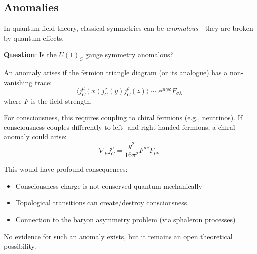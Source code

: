 \begin{advanced}
\subsection{Anomalies}

In quantum field theory, classical symmetries can be \textit{anomalous}---they are broken by quantum effects.

\textbf{Question}: Is the $U(1)_C$ gauge symmetry anomalous?

An anomaly arises if the fermion triangle diagram (or its analogue) has a non-vanishing trace:
\begin{equation}
\langle j^\mu_C(x) j^\nu_C(y) j^\rho_C(z) \rangle \sim \epsilon^{\mu\nu\rho\sigma} F_{\sigma\lambda}
\end{equation}
where $F$ is the field strength.

For consciousness, this requires coupling to chiral fermions (e.g., neutrinos). If consciousness couples differently to left- and right-handed fermions, a chiral anomaly could arise:
\begin{equation}
\nabla_\mu j^\mu_C = \frac{g^2}{16\pi^2} F^{\mu\nu} \tilde{F}_{\mu\nu}
\end{equation}

This would have profound consequences:
\begin{itemize}
\item Consciousness charge is not conserved quantum mechanically
\item Topological transitions can create/destroy consciousness
\item Connection to the baryon asymmetry problem (via sphaleron processes)
\end{itemize}

No evidence for such an anomaly exists, but it remains an open theoretical possibility.
\end{advanced}

